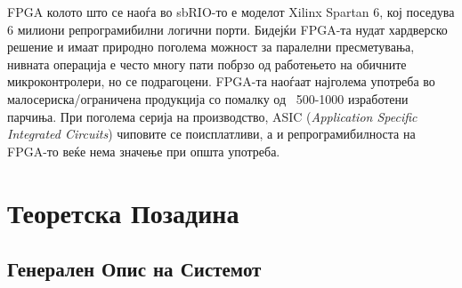 \documentclass[11pt]{article}
\begin{document}
		  FPGA колото што се наоѓа во sbRIO-то е моделот Xilinx Spartan 6, кој поседува 6 милиони репрограмибилни логични порти. Бидејќи FPGA-та нудат хардверско решение и имаат природно поголема можност за паралелни пресметувања, нивната операција е често многу пати побрзо од работењето на обичните микроконтролери, но се подрагоцени. FPGA-та наоѓаат најголема употреба во малосериска/ограничена продукција со помалку од ~500-1000 изработени парчиња. При поголема серија на производство, ASIC (\textit{Application Specific Integrated Circuits}) чиповите се поисплатливи, а и репрограмибилноста на FPGA-то веќе нема значење при општа употреба.

\newpage

\section{Теоретска Позадина}

  \subsection{Генерален Опис на Системот}
    \label{sec:general_desc}
\end{document}
